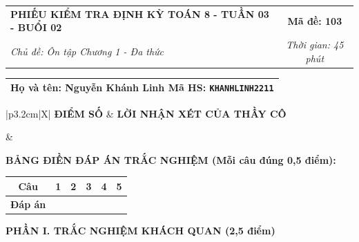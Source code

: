\documentclass[12pt,a4paper]{article}
\begin{document}
\newpage


\noindent
\begin{tabularx}{\linewidth}{|X|c|}
\hline
\textbf{PHIẾU KIỂM TRA ĐỊNH KỲ TOÁN 8 - TUẦN 03 - BUỔI 02} & \textbf{Mã đề: 103} \\
\textit{Chủ đề: Ôn tập Chương 1 - Đa thức} & \textit{Thời gian: 45 phút} \\
\hline
\end{tabularx}

\vspace{1mm}

\noindent
\begin{tabularx}{\linewidth}{|X|}
\hline
\rule[-2mm]{0pt}{7.5mm}\textbf{Họ và tên:} \textbf{\large Nguyễn Khánh Linh} \hfill \textbf{Mã HS:} \texttt{KHANHLINH2211} \quad \\
\hline
\end{tabularx}

\vspace{1mm}

\noindent
\begin{tabularx}{\linewidth}{|p{3.2cm}|X|}
\hline
\centering\textbf{ĐIỂM SỐ} & \centering\textbf{LỜI NHẬN XÉT CỦA THẦY CÔ} \tabularnewline
\hline
\rule{0pt}{1.3cm} & \tabularnewline
\hline
\end{tabularx}

\vspace{1.2mm}

\noindent\textbf{BẢNG ĐIỀN ĐÁP ÁN TRẮC NGHIỆM (Mỗi câu đúng 0,5 điểm):}
\vspace{0.8mm}

\noindent
\renewcommand{\arraystretch}{1.35}
\begin{tabularx}{\linewidth}{|c|*{5}{>{\centering\arraybackslash}X|}}
\hline
\textbf{Câu} & \textbf{1} & \textbf{2} & \textbf{3} & \textbf{4} & \textbf{5} \\
\hline
\textbf{Đáp án} & & & & & \\
\hline
\end{tabularx}
\renewcommand{\arraystretch}{1.0}

\vspace{1.5mm}

\noindent\textbf{\large PHẦN I. TRẮC NGHIỆM KHÁCH QUAN (2,5 điểm)}
\vspace{1mm}
\end{document}

